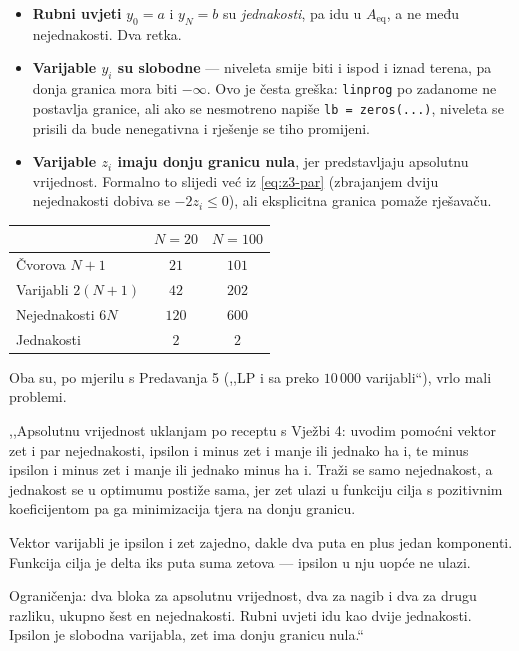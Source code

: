 \begin{korak}
\begin{itemize}[leftmargin=*]
  \item \textbf{Rubni uvjeti} $y_0 = a$ i $y_N = b$ su \emph{jednakosti}, pa idu
        u $A_{\mathrm{eq}}$, a ne među nejednakosti. Dva retka.
  \item \textbf{Varijable $y_i$ su slobodne} --- niveleta smije biti i ispod i
        iznad terena, pa donja granica mora biti $-\infty$. Ovo je česta greška:
        \texttt{linprog} po zadanome ne postavlja granice, ali ako se nesmotreno
        napiše \texttt{lb = zeros(...)}, niveleta se prisili da bude nenegativna
        i rješenje se tiho promijeni.
  \item \textbf{Varijable $z_i$ imaju donju granicu nula}, jer predstavljaju
        apsolutnu vrijednost. Formalno to slijedi već iz \eqref{eq:z3-par}
        (zbrajanjem dviju nejednakosti dobiva se $-2z_i \leq 0$), ali eksplicitna
        granica pomaže rješavaču.
\end{itemize}
\end{korak}

\begin{korak}
\begin{center}
\begin{tabular}{lcc}
\toprule
& $N = 20$ & $N = 100$ \\
\midrule
Čvorova $N+1$ & $21$ & $101$ \\
Varijabli $2(N+1)$ & $42$ & $202$ \\
Nejednakosti $6N$ & $120$ & $600$ \\
Jednakosti & $2$ & $2$ \\
\bottomrule
\end{tabular}
\end{center}
Oba su, po mjerilu s Predavanja 5 (,,LP i sa preko $10\,000$ varijabli``), vrlo
mali problemi.
\end{korak}

\begin{izgovor}
,,Apsolutnu vrijednost uklanjam po receptu s Vježbi 4: uvodim pomoćni vektor zet
i par nejednakosti, ipsilon i minus zet i manje ili jednako ha i, te minus
ipsilon i minus zet i manje ili jednako minus ha i. Traži se samo nejednakost, a
jednakost se u optimumu postiže sama, jer zet ulazi u funkciju cilja s
pozitivnim koeficijentom pa ga minimizacija tjera na donju granicu.

Vektor varijabli je ipsilon i zet zajedno, dakle dva puta en plus jedan
komponenti. Funkcija cilja je delta iks puta suma zetova --- ipsilon u nju uopće
ne ulazi.

Ograničenja: dva bloka za apsolutnu vrijednost, dva za nagib i dva za drugu
razliku, ukupno šest en nejednakosti. Rubni uvjeti idu kao dvije jednakosti.
Ipsilon je slobodna varijabla, zet ima donju granicu nula.``
\end{izgovor}
